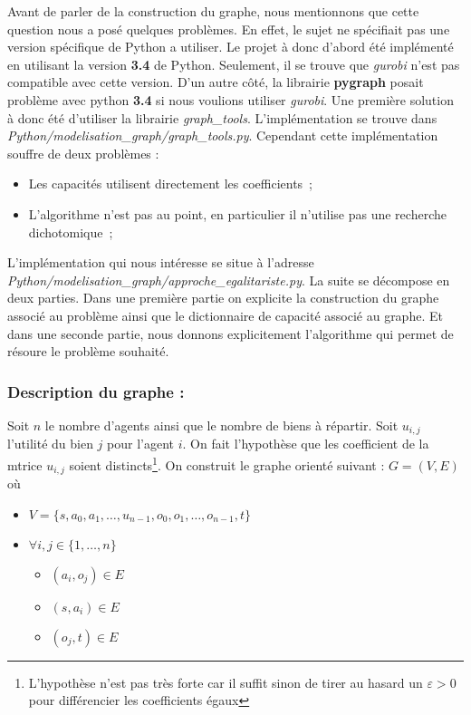 \documentclass[a4paper, titlepage, oneside, 12pt]{article}%
\begin{document}
Avant de parler de la construction du graphe, nous mentionnons que cette question nous a posé quelques problèmes. En effet, le sujet ne spécifiait pas une version spécifique de Python a utiliser. Le projet à donc d'abord été implémenté en utilisant la version \textbf{3.4} de Python. Seulement, il se trouve que \textit{gurobi} n'est pas compatible avec cette version. D'un autre côté, la librairie \textbf{pygraph} posait problème avec python \textbf{3.4} si nous voulions utiliser \textit{gurobi}. Une première solution à donc été d'utiliser la librairie \textit{graph\_tools}. L'implémentation se trouve dans \textit{Python/modelisation\_graph/graph\_tools.py}. Cependant cette implémentation souffre de deux problèmes :
\begin{itemize}
\item Les capacités utilisent directement les coefficients~;
\item L'algorithme n'est pas au point, en particulier il n'utilise pas une recherche dichotomique~;
\end{itemize}

L'implémentation qui nous intéresse se situe à l'adresse \textit{Python/modelisation\_graph/approche\_egalitariste.py}. La suite se décompose en deux parties. Dans une première partie on explicite la construction du graphe associé au problème ainsi que le dictionnaire de capacité associé au graphe. Et dans une seconde partie, nous donnons explicitement l'algorithme qui permet de résoure le problème souhaité.

\subsubsection{Description du graphe : } 

Soit $n$ le nombre d'agents ainsi que le nombre de biens à répartir. Soit $u_{i,j}$ l'utilité du bien $j$ pour l'agent $i$. 
On fait l'hypothèse que les coefficient de la mtrice $u_{i,j}$ soient distincts\footnote{L'hypothèse n'est pas très forte car il suffit sinon de tirer au hasard un $\varepsilon>0$ pour différencier les coefficients égaux}. 
On construit le graphe orienté suivant :
$G=(V,E)$ où 
\begin{itemize}
\item $V=\{s,a_0,a_1,\dots, u_{n-1}, o_0,o_1,\dots, o_{n-1},t\}$
\item $\forall i,j \in \{1,\dots, n\} $
  \begin{itemize}
  \item $(a_i,o_j)\in E $
  \item $(s,a_i)\in E$
  \item $(o_j,t) \in E$
  \end{itemize}
\end{itemize}  
\end{document}
